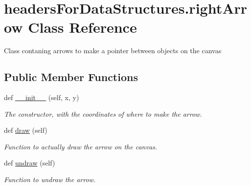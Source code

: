 \hypertarget{classheaders_for_data_structures_1_1right_arrow}{}\section{headers\+For\+Data\+Structures.\+right\+Arrow Class Reference}
\label{classheaders_for_data_structures_1_1right_arrow}


Class contaning arrows to make a pointer between objects on the canvas  


\subsection*{Public Member Functions}
\begin{DoxyCompactItemize}
\item 
\mbox{\label{classheaders_for_data_structures_1_1right_arrow_a0d53d254a151ec5db5331c8a6afd36c0}} 
def \hyperlink{classheaders_for_data_structures_1_1right_arrow_a0d53d254a151ec5db5331c8a6afd36c0}{\+\_\+\+\_\+init\+\_\+\+\_\+} (self, x, y)
\begin{DoxyCompactList}\small\item\em The constructor, with the coordinates of where to make the arrow. \end{DoxyCompactList}\item 
\mbox{\label{classheaders_for_data_structures_1_1right_arrow_a0ab3e6bded6c7acb0c4dc9ba61d7ac31}} 
def \hyperlink{classheaders_for_data_structures_1_1right_arrow_a0ab3e6bded6c7acb0c4dc9ba61d7ac31}{draw} (self)
\begin{DoxyCompactList}\small\item\em Function to actually draw the arrow on the canvas. \end{DoxyCompactList}\item 
\mbox{\label{classheaders_for_data_structures_1_1right_arrow_a0a5c65179b5c92ce3d79d6f1c1678b5b}} 
def \hyperlink{classheaders_for_data_structures_1_1right_arrow_a0a5c65179b5c92ce3d79d6f1c1678b5b}{undraw} (self)
\begin{DoxyCompactList}\small\item\em Function to undraw the arrow. \end{DoxyCompactList}\item 

\end{DoxyCompactItemize}
